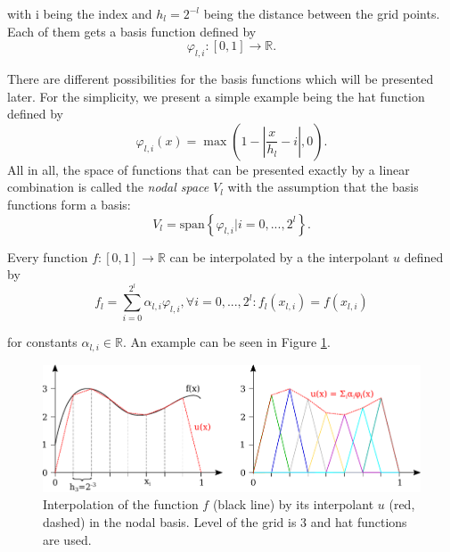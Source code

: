 with i being the index and $ h_l = 2^{-l} $ being the distance between the grid points. Each of them gets a basis function defined by 
\begin{equation}
	\varphi_{l,i}: [0,1] \rightarrow \mathbb{R}.
\end{equation}

There are different possibilities for the basis functions which will be presented later. For the simplicity, we present a simple example being the hat function defined by
\begin{equation}
	\varphi_{l,i}(x) = \max\left(1- \left|\frac{x}{h_l}-i\right|, 0\right).
\end{equation}
All in all, the space of functions that can be presented exactly by a linear combination is called the \textit{nodal space} $V_l$ with the assumption that the basis functions form a basis:
\begin{equation}
	V_l = \text{span}\left\{ \varphi_{l,i} | i = 0,...,2^l\right\}. 
\end{equation}

Every function $f: [0,1] \rightarrow \mathbb{R}$ can be interpolated by a the interpolant $ u $ defined by
\begin{equation}
	f_l = \sum_{i=0}^{2^l}\alpha_{l,i} \varphi_{l,i}, \forall i = 0,...,2^l: f_l(x_{l,i}) = f(x_{l,i})
\end{equation}

for constants $ \alpha_{l,i} \in \mathbb{R} $. An example can be seen in Figure \ref{fig:interpolant}.


\begin{figure}[H]
	\centering
	\includegraphics[width=\textwidth]{figures/Fig_2_5_interpolant}
	\caption{  Interpolation of the function $ f $ (black line) by its interpolant $ u $ (red, dashed) in the nodal basis. Level of the grid is 3 and hat functions are used. }
	\label{fig:interpolant}
\end{figure}


